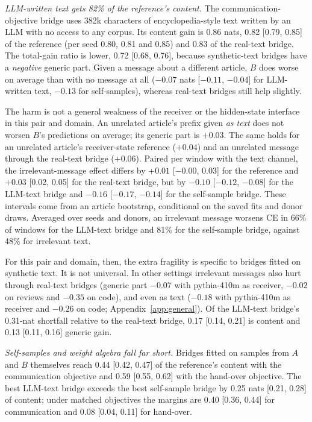 \emph{LLM-written text gets 82\% of the reference's content.} The communication-objective bridge uses 382k characters of encyclopedia-style text written by an LLM with no access to any corpus. Its content gain is 0.86 nats, 0.82 [0.79, 0.85] of the reference (per seed 0.80, 0.81 and 0.85) and 0.83 of the real-text bridge. The total-gain ratio is lower, 0.72 [0.68, 0.76], because synthetic-text bridges have a \emph{negative} generic part. Given a message about a different article, $B$ does worse on average than with no message at all ($-0.07$ nats [$-0.11$, $-0.04$] for LLM-written text, $-0.13$ for self-samples), whereas real-text bridges still help slightly.

The harm is not a general weakness of the receiver or the hidden-state interface in this pair and domain. An unrelated article's prefix given \emph{as text} does not worsen $B$'s predictions on average; its generic part is $+0.03$. The same holds for an unrelated article's receiver-state reference ($+0.04$) and an unrelated message through the real-text bridge ($+0.06$). Paired per window with the text channel, the irrelevant-message effect differs by $+0.01$ [$-0.00$, 0.03] for the reference and $+0.03$ [0.02, 0.05] for the real-text bridge, but by $-0.10$ [$-0.12$, $-0.08$] for the LLM-text bridge and $-0.16$ [$-0.17$, $-0.14$] for the self-sample bridge. These intervals come from an article bootstrap, conditional on the saved fits and donor draws. Averaged over seeds and donors, an irrelevant message worsens CE in 66\% of windows for the LLM-text bridge and 81\% for the self-sample bridge, against 48\% for irrelevant text.

For this pair and domain, then, the extra fragility is specific to bridges fitted on synthetic text. It is not universal. In other settings irrelevant messages also hurt through real-text bridges (generic part $-0.07$ with pythia-410m as receiver, $-0.02$ on reviews and $-0.35$ on code), and even as text ($-0.18$ with pythia-410m as receiver and $-0.26$ on code; Appendix~\ref{app:general}). Of the LLM-text bridge's 0.31-nat shortfall relative to the real-text bridge, 0.17 [0.14, 0.21] is content and 0.13 [0.11, 0.16] generic gain.

\emph{Self-samples and weight algebra fall far short.} Bridges fitted on samples from $A$ and $B$ themselves reach 0.44 [0.42, 0.47] of the reference's content with the communication objective and 0.59 [0.55, 0.62] with the hand-over objective. The best LLM-text bridge exceeds the best self-sample bridge by 0.25 nats [0.21, 0.28] of content; under matched objectives the margins are 0.40 [0.36, 0.44] for communication and 0.08 [0.04, 0.11] for hand-over.

